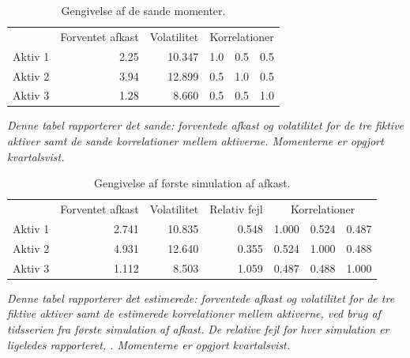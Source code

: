 \documentclass[
  a4paper,
  oneside]{memoir}
\begin{document}
\begin{table}[H]

\caption{\label{tab:true}Gengivelse af de sande momenter.}
\centering
\begin{threeparttable}
\begin{tabular}[t]{lrrrrr}
\toprule
\multicolumn{1}{c}{ } & \multicolumn{1}{c}{Forventet afkast} & \multicolumn{1}{c}{Volatilitet} & \multicolumn{3}{c}{Korrelationer} \\
\cmidrule(l{3pt}r{3pt}){2-2} \cmidrule(l{3pt}r{3pt}){3-3} \cmidrule(l{3pt}r{3pt}){4-6}
\rowcolor{gray!6}  Aktiv 1 & 2.25 & 10.347 & 1.0 & 0.5 & 0.5\\
Aktiv 2 & 3.94 & 12.899 & 0.5 & 1.0 & 0.5\\
\rowcolor{gray!6}  Aktiv 3 & 1.28 & 8.660 & 0.5 & 0.5 & 1.0\\
\bottomrule
\end{tabular}
\begin{tablenotes}
\item \textit{Denne tabel rapporterer det sande: forventede afkast og volatilitet for de tre fiktive aktiver samt de sande korrelationer mellem aktiverne. Momenterne er opgjort kvartalsvist.}
\end{tablenotes}
\end{threeparttable}
\end{table}



\begin{table}[H]

\caption{\label{tab:sim1}Gengivelse af første simulation af afkast.}
\centering
\begin{threeparttable}
\begin{tabular}[t]{lrrrrrr}
\toprule
\multicolumn{1}{c}{ } & \multicolumn{1}{c}{Forventet afkast} & \multicolumn{1}{c}{Volatilitet} & \multicolumn{1}{c}{Relativ fejl} & \multicolumn{3}{c}{Korrelationer} \\
\cmidrule(l{3pt}r{3pt}){2-2} \cmidrule(l{3pt}r{3pt}){3-3} \cmidrule(l{3pt}r{3pt}){4-4} \cmidrule(l{3pt}r{3pt}){5-7}
\rowcolor{gray!6}  Aktiv 1 & 2.741 & 10.835 & 0.548 & 1.000 & 0.524 & 0.487\\
Aktiv 2 & 4.931 & 12.640 & 0.355 & 0.524 & 1.000 & 0.488\\
\rowcolor{gray!6}  Aktiv 3 & 1.112 & 8.503 & 1.059 & 0.487 & 0.488 & 1.000\\
\bottomrule
\end{tabular}
\begin{tablenotes}
\item \textit{Denne tabel rapporterer det estimerede: forventede afkast og volatilitet for de tre fiktive aktiver samt de estimerede korrelationer mellem aktiverne, ved brug af tidsserien fra første simulation af afkast. De relative fejl for hver simulation er ligeledes rapporteret, \citep{Asmussen2007}. Momenterne er opgjort kvartalsvist.}
\end{tablenotes}
\end{threeparttable}
\end{table}
\end{document}
